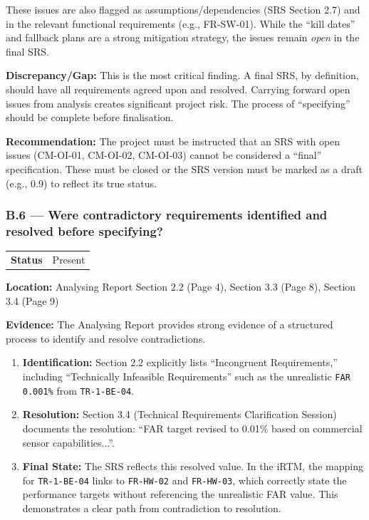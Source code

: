 \documentclass[11pt,a4paper]{article}
\begin{document}
These issues are also flagged as assumptions/dependencies (SRS Section 2.7) and in the relevant functional requirements (e.g., FR-SW-01). While the ``kill dates'' and fallback plans are a strong mitigation strategy, the issues remain \textit{open} in the final SRS.

\textbf{Discrepancy/Gap:} This is the most critical finding. A final SRS, by definition, should have all requirements agreed upon and resolved. Carrying forward open issues from analysis creates significant project risk. The process of ``specifying'' should be complete before finalisation.

\textbf{Recommendation:} The project must be instructed that an SRS with open issues (CM-OI-01, CM-OI-02, CM-OI-03) cannot be considered a ``final'' specification. These must be closed or the SRS version must be marked as a draft (e.g., 0.9) to reflect its true status.

\vspace{0.8em}

\subsubsection*{B.6 --- Were contradictory requirements identified and resolved before specifying?}

\begin{tabular}{p{}p{}}
\textbf{Status} & Present \\
\end{tabular}

\textbf{Location:} Analysing Report Section 2.2 (Page 4), Section 3.3 (Page 8), Section 3.4 (Page 9)

\textbf{Evidence:} The Analysing Report provides strong evidence of a structured process to identify and resolve contradictions.

\begin{enumerate}
\item \textbf{Identification:} Section 2.2 explicitly lists ``Incongruent Requirements,'' including ``Technically Infeasible Requirements'' such as the unrealistic \texttt{FAR 0.001\%} from \texttt{TR-1-BE-04}.

\item \textbf{Resolution:} Section 3.4 (Technical Requirements Clarification Session) documents the resolution: ``FAR target revised to 0.01\% based on commercial sensor capabilities...''.

\item \textbf{Final State:} The SRS reflects this resolved value. In the iRTM, the mapping for \texttt{TR-1-BE-04} links to \texttt{FR-HW-02} and \texttt{FR-HW-03}, which correctly state the performance targets without referencing the unrealistic FAR value. This demonstrates a clear path from contradiction to resolution.
\end{enumerate}
\end{document}
